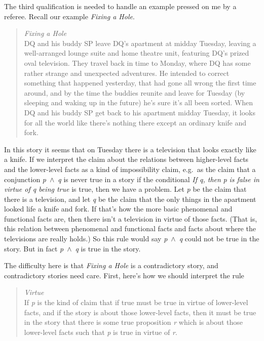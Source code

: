 \documentclass[
  10pt,
  letterpaper,
  DIV=11,
  numbers=noendperiod,
  twoside]{scrartcl}
\begin{document}
The third qualification is needed to handle an example pressed on me by
a referee. Recall our example \emph{Fixing a Hole}.

\begin{quote}
\emph{Fixing a Hole}\\
DQ and his buddy SP leave DQ's apartment at midday Tuesday, leaving a
well-arranged lounge suite and home theatre unit, featuring DQ's prized
oval television. They travel back in time to Monday, where DQ has some
rather strange and unexpected adventures. He intended to correct
something that happened yesterday, that had gone all wrong the first
time around, and by the time the buddies reunite and leave for Tuesday
(by sleeping and waking up in the future) he's sure it's all been
sorted. When DQ and his buddy SP get back to his apartment midday
Tuesday, it looks for all the world like there's nothing there except an
ordinary knife and fork.
\end{quote}

In this story it seems that on Tuesday there is a television that looks
exactly like a knife. If we interpret the claim about the relations
between higher-level facts and the lower-level facts as a kind of
impossibility claim, e.g.~as the claim that a conjunction
\emph{p}~\({\wedge}\)~\emph{q} is never true in a story if the
conditional \emph{If q, then} \emph{p} \emph{is false in virtue of q
being true} is true, then we have a problem. Let \emph{p} be the claim
that there is a television, and let \emph{q} be the claim that the only
things in the apartment looked life a knife and fork. If that's how the
more basic phenomenal and functional facts are, then there isn't a
television in virtue of those facts. (That is, this relation between
phenomenal and functional facts and facts about where the televisions
are really holds.) So this rule would say \emph{p}~\({\wedge}\)~\emph{q}
could not be true in the story. But in fact
\emph{p}~\({\wedge}\)~\emph{q} is true in the story.

The difficulty here is that \emph{Fixing a Hole} is a contradictory
story, and contradictory stories need care. First, here's how we should
interpret the rule

\begin{quote}
\emph{Virtue}\\
If \emph{p} is the kind of claim that if true must be true in virtue of
lower-level facts, and if the story is about those lower-level facts,
then it must be true in the story that there is some true proposition
\emph{r} which is about those lower-level facts such that \emph{p} is
true in virtue of \emph{r}.
\end{quote}
\end{document}

